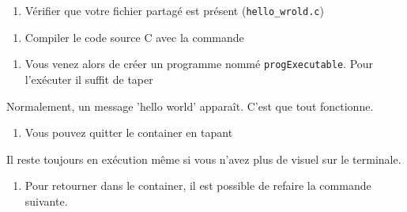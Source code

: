 \documentclass[french, 12pt]{article}%
\begin{document}

\begin{enumerate}[resume]
\item Vérifier que votre fichier partagé est présent  (\verb?hello_wrold.c?)
\end{enumerate}


\begin{enumerate}[resume]
\item Compiler le code source C avec la commande
\end{enumerate}


\begin{enumerate}[resume]
\item Vous venez alors de créer un programme nommé \verb?progExecutable?. Pour l'exécuter il suffit de taper
\end{enumerate}


Normalement, un message 'hello world' apparaît. C'est que tout fonctionne.

\begin{enumerate}[resume]
\item Vous pouvez quitter le container en tapant 
\end{enumerate}


Il reste toujours en exécution même si vous n'avez plus de visuel sur le terminale. 

\begin{enumerate}[resume]
\item Pour retourner dans le container, il est possible de refaire la commande suivante.
\end{enumerate}
\end{document}
